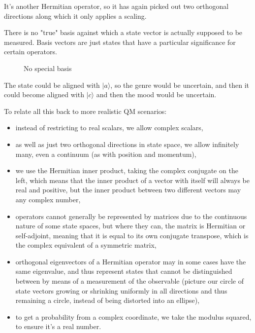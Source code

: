 It's another Hermitian operator, so it has again picked out two orthogonal directions along which it only applies a scaling.

There is no "true" basis against which a state vector is actually supposed to be measured. Basis vectors are just states that have a particular significance for certain operators.

\begin{figure}[h]
  \centering
  \centering
  \caption{No special basis} \label{fig:state-no-special-basis}
\end{figure}

The state could be aligned with $|a\rangle$, so the genre would be uncertain, and then it could become aligned with $|c\rangle$ and then the mood would be uncertain.

To relate all this back to more realistic QM scenarios:

\begin{itemize}
  \item instead of restricting to real scalars, we allow complex scalars,
  \item as well as just two orthogonal directions in state space, we allow infinitely many, even a continuum (as with position and momentum),
  \item we use the Hermitian inner product, taking the complex conjugate on the left, which means that the inner product of a vector with itself will always be real and positive, but the inner product between two different vectors may any complex number,
  \item operators cannot generally be represented by matrices due to the continuous nature of some state spaces, but where they can, the matrix is Hermitian or self-adjoint, meaning that it is equal to its own conjugate transpose, which is the complex equivalent of a symmetric matrix,
  \item orthogonal eigenvectors of a Hermitian operator may in some cases have the same eigenvalue, and thus represent states that cannot be distinguished between by means of a measurement of the observable (picture our circle of state vectors growing or shrinking uniformly in all directions and thus remaining a circle, instead of being distorted into an ellipse),
  \item to get a probability from a complex coordinate, we take the modulus squared, to ensure it's a real number.
\end{itemize}

